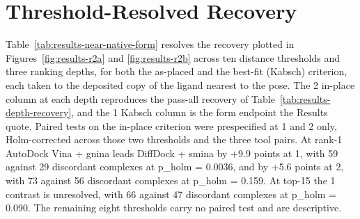 \hypertarget{threshold-resolved-recovery}{%
\section{Threshold-Resolved Recovery}\label{threshold-resolved-recovery}}

Table~\ref{tab:results-near-native-form} resolves the recovery plotted in Figures~\ref{fig:results-r2a} and \ref{fig:results-r2b} across ten distance thresholds and three ranking depths, for both the as-placed and the best-fit (Kabsch) criterion, each taken to the deposited copy of the ligand nearest to the pose. The 2\angstrom{} in-place column at each depth reproduces the pass-all recovery of Table~\ref{tab:results-depth-recovery}, and the 1\angstrom{} Kabsch column is the form endpoint the Results quote. Paired tests on the in-place criterion were prespecified at 1\angstrom{} and 2\angstrom{} only, Holm-corrected across those two thresholds and the three tool pairs. At rank-1 AutoDock Vina + gnina leads DiffDock + smina by +9.9 points at 1\angstrom{}, with 59 against 29 discordant complexes at p\_holm = 0.0036, and by +5.6 points at 2\angstrom{}, with 73 against 56 discordant complexes at p\_holm = 0.159. At top-15 the 1\angstrom{} contrast is unresolved, with 66 against 47 discordant complexes at p\_holm = 0.090. The remaining eight thresholds carry no paired test and are descriptive.


